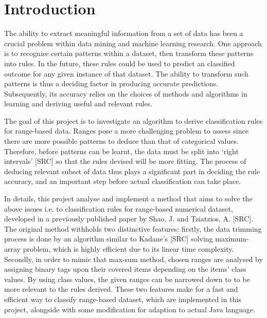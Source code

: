 \chapter{Introduction}

The ability to extract meaningful information from a set of data has been a crucial problem within data mining and machine learning research. One approach is to recognise certain patterns within a dataset, then transform these patterns into rules. In the future, these rules could be used to predict an classified outcome for any given instance of that dataset. The ability to transform such patterns is thus a deciding factor in producing accurate predictions. Subsequently, its accuracy relies on the choices of methods and algorithms in learning and deriving useful and relevant rules. 

The goal of this project is to investigate an algorithm to derive classification rules for range-based data. Ranges pose a more challenging problem to assess since there are more possible patterns to deduce than that of categorical values. Therefore, before patterns can be learnt, the data must be split into `right intervals' [SRC] so that the rules devised will be more fitting. The process of deducing relevant subset of data thus plays a significant part in deciding the rule accuracy, and an important step before actual classification can take place. 


In details, this project analyse and implement a method that aims to solve the above issues i.e. to classification rules for range-based numerical dataset, developed in a previously published paper by Shao, J. and Tziatzios, A. [SRC]. The original method withholds two distinctive features: firstly, the data trimming process is done by an algorithm similar to Kadane's [SRC] solving maximum-array problem, which is highly efficient due to its linear time complexity. Secondly, in order to mimic that max-sum method, chosen ranges are analysed by assigning binary tags upon their covered items depending on the items' class values. By using class values, the given ranges can be narrowed down to to be more relevant to the rules derived. These two features make for a fast and efficient way to classify range-based dataset, which are implemented in this project, alongside with some modification for adaption to actual Java language.





